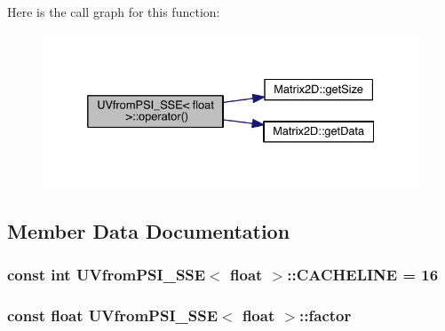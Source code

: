Here is the call graph for this function\+:\nopagebreak
\begin{figure}[H]
\begin{center}
\leavevmode
\includegraphics[width=332pt]{d5/d4e/struct_u_vfrom_p_s_i___s_s_e_3_01float_01_4_aff805046b744c5b622b8a241e1dac4a3_cgraph}
\end{center}
\end{figure}




\subsection{Member Data Documentation}
\hypertarget{struct_u_vfrom_p_s_i___s_s_e_3_01float_01_4_a5ad54c9a7e5e60f5fb1962e176134624}{}
\subsubsection[{C\+A\+C\+H\+E\+L\+I\+N\+E}]{\setlength{\rightskip}{0pt plus 5cm}const int {\bf U\+Vfrom\+P\+S\+I\+\_\+\+S\+S\+E}$<$ float $>$\+::C\+A\+C\+H\+E\+L\+I\+N\+E = 16\hspace{0.3cm}{\ttfamily [static]}}\label{struct_u_vfrom_p_s_i___s_s_e_3_01float_01_4_a5ad54c9a7e5e60f5fb1962e176134624}
\hypertarget{struct_u_vfrom_p_s_i___s_s_e_3_01float_01_4_a0cdc869087c869067277eae491256240}{}
\subsubsection[{factor}]{\setlength{\rightskip}{0pt plus 5cm}const float {\bf U\+Vfrom\+P\+S\+I\+\_\+\+S\+S\+E}$<$ float $>$\+::factor}\label{struct_u_vfrom_p_s_i___s_s_e_3_01float_01_4_a0cdc869087c869067277eae491256240}
\hypertarget{struct_u_vfrom_p_s_i___s_s_e_3_01float_01_4_a0676bb743f7fca184c9b78ba95b38130}{}

